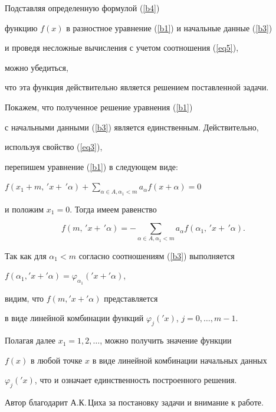 \begin{pf}


Подставляя определенную формулой (\ref{b4})


функцию $f(x)$ в разностное уравнение (\ref{b1}) и начальные данные (\ref{b3})


и проведя несложные вычисления с учетом соотношения (\ref{eq5}),


можно убедиться,


что эта функция действительно является решением поставленной задачи.





Покажем, что полученное решение уравнения (\ref{b1})


с начальными данными (\ref{b3}) является единственным. Действительно,


используя свойство (\ref{eq3}),


перепишем уравнение (\ref{b1}) в следующем виде:


$f(x_1+m,\,'x+ \,'\alpha)+\sum\limits_{{\alpha\in A,\alpha_1<m}}


a_\alpha f(x+\alpha)=0$


и положим $x_1=0$. Тогда имеем равенство


$$


f(m,\,'x+ \,'\alpha)=-\sum_{{\alpha\in A,\alpha_1<m}}


a_\alpha f(\alpha_1,\,'x+\,'\alpha).


$$


Так как для $\alpha_1<m$ согласно соотношениям (\ref{b3}) выполняется


$f(\alpha_1,'x+'\alpha)=\varphi_{\alpha_1}('x+'\alpha)$,


видим, что $f(m, 'x+ '\alpha)$ представляется


в виде линейной комбинации функций $\varphi_j('x)$, $j=0,\dotsc,m-1$.


Полагая далее $x_1=1,2,\dotsc$, можно получить значение функции


$f(x)$ в любой точке $x$ в виде линейной комбинации начальных данных


$\varphi_j('x)$, что и означает единственность построенного решения.


\end{pf}





Автор благодарит А.К.\,Циха за постановку задачи и внимание к работе.








